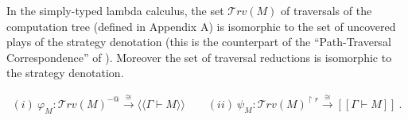 \documentclass{llncs}
\newcommand\travset{\mathcal{T}rv}
\newcommand{\sem}[1]{{[\![ #1 ]\!]}}
\newcommand{\intersem}[1]{{\langle\!\langle #1 \rangle\!\rangle}}
\begin{document}
In the simply-typed lambda calculus, the set $\travset(M)$ of
traversals of the computation tree (defined in Appendix A) is
isomorphic to the set of uncovered plays of the strategy denotation
(this is the counterpart of the ``Path-Traversal Correspondence'' of
\cite{OngLics2006}). Moreover the set of traversal reductions is
isomorphic to the strategy denotation.

\begin{theorem}
\label{thm:correspondence}
\begin{eqnarray*}
(i) \  \varphi_M  : \travset(M)^{-@} \stackrel{\cong}{\longrightarrow} \intersem{\Gamma \vdash M} \qquad
(ii) \  \psi_M  : \travset(M)^{\upharpoonright r} \stackrel{\cong}{\longrightarrow} \sem{\Gamma \vdash M} \ .
\end{eqnarray*}
\end{theorem}
\end{document}
